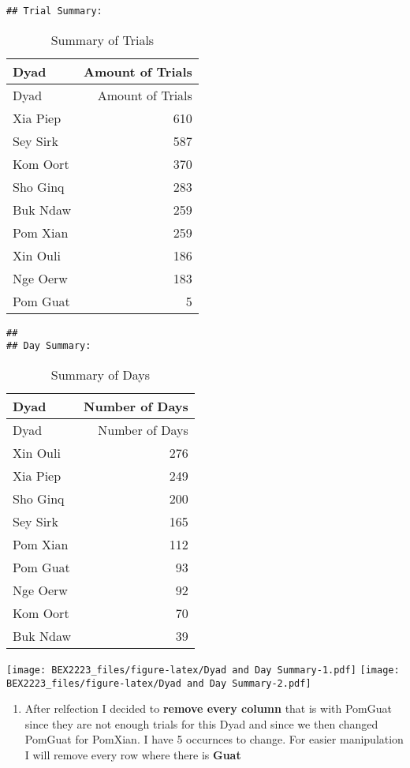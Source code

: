 \documentclass[
]{article}
\providecommand{\tightlist}{%
  \setlength{\itemsep}{0pt}\setlength{\parskip}{0pt}}
\begin{document}
\begin{verbatim}
## Trial Summary:
\end{verbatim}

\begin{longtable}[]{@{}lr@{}}
\caption{Summary of Trials}\tabularnewline
\toprule
Dyad & Amount of Trials \\
\midrule
\endfirsthead
\toprule
Dyad & Amount of Trials \\
\midrule
\endhead
Xia Piep & 610 \\
Sey Sirk & 587 \\
Kom Oort & 370 \\
Sho Ginq & 283 \\
Buk Ndaw & 259 \\
Pom Xian & 259 \\
Xin Ouli & 186 \\
Nge Oerw & 183 \\
Pom Guat & 5 \\
\bottomrule
\end{longtable}

\begin{verbatim}
## 
## Day Summary:
\end{verbatim}

\begin{longtable}[]{@{}lr@{}}
\caption{Summary of Days}\tabularnewline
\toprule
Dyad & Number of Days \\
\midrule
\endfirsthead
\toprule
Dyad & Number of Days \\
\midrule
\endhead
Xin Ouli & 276 \\
Xia Piep & 249 \\
Sho Ginq & 200 \\
Sey Sirk & 165 \\
Pom Xian & 112 \\
Pom Guat & 93 \\
Nge Oerw & 92 \\
Kom Oort & 70 \\
Buk Ndaw & 39 \\
\bottomrule
\end{longtable}

\texttt{[image: BEX2223\_files/figure-latex/Dyad and Day Summary-1.pdf]}
\texttt{[image: BEX2223\_files/figure-latex/Dyad and Day Summary-2.pdf]}

\begin{enumerate}
\def\labelenumi{\arabic{enumi}.}
\setcounter{enumi}{4}
\tightlist
\item
  After relfection I decided to \textbf{remove every column} that is
  with PomGuat since they are not enough trials for this Dyad and since
  we then changed PomGuat for PomXian. I have 5 occurnces to change. For
  easier manipulation I will remove every row where there is
  \textbf{Guat}
\end{enumerate}
\end{document}
